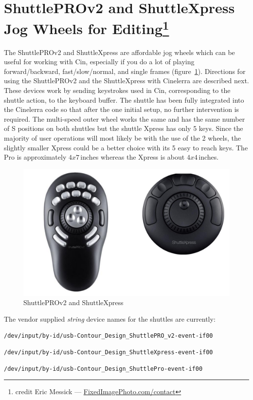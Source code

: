 \section[ShuttlePROv2 and ShuttleXpress Jog Wheels for Editing]{ShuttlePROv2 and ShuttleXpress Jog Wheels for Editing\protect\footnote{credit Eric Messick --- \url{FixedImagePhoto.com/contact}}}%
\label{sec:shuttle_jog_wheels_editing}


The ShuttlePROv2 and ShuttleXpress are affordable jog wheels which can be useful for working with Cin, especially if you do a lot of playing forward/backward, fast/slow/normal, and single frames (figure~\ref{fig:shuttle}).
Directions for using the ShuttlePROv2 and the ShuttleXpress with Cinelerra are described next. These devices work by sending keystrokes used in Cin, corresponding to the shuttle action, to the keyboard buffer. The shuttle has been fully integrated into the Cinelerra code so that after the one initial setup, no further intervention is required.  The multi-speed outer wheel works the same and has the same number of S positions on both shuttles but the shuttle Xpress has only 5 keys.  Since the majority of user operations will most likely be with the use of the 2 wheels, the slightly smaller Xpress could be a better choice with its 5 easy to reach keys.  The Pro is approximately $4x7$\,inches whereas the Xpress is about $4x4$\,inches.

\begin{figure}[htpb]
    \centering
    \includegraphics[width=0.9\linewidth]{images/shuttle.png}
    \caption{ShuttlePROv2 and ShuttleXpress}
    \label{fig:shuttle}
\end{figure}

\noindent The vendor supplied \textit{string} device names for the shuttles are currently:

{\small
\vspace{1ex} \texttt{/dev/input/by-id/usb-Contour\_Design\_ShuttlePRO\_v2-event-if00}
 
 \texttt{/dev/input/by-id/usb-Contour\_Design\_ShuttleXpress-event-if00}
 
 \texttt{/dev/input/by-id/usb-Contour\_Design\_ShuttlePro-event-if00}
 }

